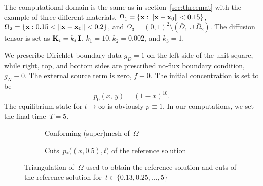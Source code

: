 
The computational domain is the same as in section~\ref{sec:threemat} with the example of three different materials.  $\Omega_1 = \{{\bf x} : \|{\bf x} - {\bf x}_0\| < 0.15\}$, $\Omega_2 = \{{\bf x} : 0.15 < \|{\bf x} - {\bf x}_0\| < 0.2\}$, and $\Omega_3 = (0,1)^2 \setminus (\bar{\Omega}_1\cup\bar{\Omega}_2)$. The diffusion tensor is set as $\boldsymbol{\mathbf{K}}_i = k_i\,\boldsymbol{\mathbf{I}}$, $k_1 = 10, k_2 = 0.002$, and $k_3 = 1$.
	
We prescribe Dirichlet boundary data $g_D = 1$ on the left side of the unit square, while right, top, and bottom sides are prescribed no-flux boundary condition, $g_N \equiv 0$. The external source term is zero, $f \equiv 0$. The initial concentration is set to be
\begin{equation*}
	p_0(x,\,y) = (1 - x)^{10}.	
\end{equation*}
The equilibrium state for $t\to\infty$ is obviously $p \equiv 1$. In our computations, we set the final time~$T = 5$.
	
\begin{figure}[h]
	\centering
	\begin{subfigure}{.4\linewidth}
		\centering
		\caption{Conforming (super)mesh of~$\Omega$}
	\end{subfigure}%
	\hfill
	\begin{subfigure}{.58\linewidth}
		\centering
		\caption{Cuts~$p_*\big((x,0.5), t\big)$ of the reference solution}	
	\end{subfigure}%
	\caption{Triangulation of~$\Omega$ used to obtain the reference solution and cuts of the reference solution for~$t \in \{0.13, 0.25, \dots, 5\}$ \label{fig:transient:ref}}
\end{figure}

